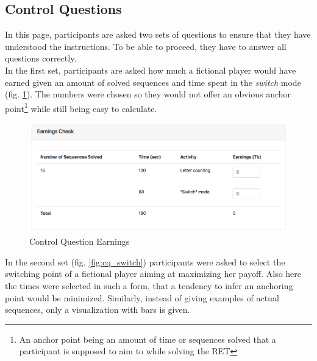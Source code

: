     \subsection{Control Questions}
    
    In this page, participants are asked two sets of questions to ensure that they have understood the instructions. To be able to proceed, they have to answer all questions correctly.\\
    
    In the first set, participants are asked how much a fictional player would have earned given an amount of solved sequences and time spent in the \textit{switch} mode (fig. \ref{fig:cq_earnings}). The numbers were chosen so they would not offer an obvious anchor point\footnote{An anchor point being an amount of time or sequences solved that a participant is supposed to aim to while solving the RET} while still being easy to calculate.\\
    
    \begin{figure}
        \centering
        \includegraphics[width=\textwidth]{graphs/cq_earnings.png}
        \caption{Control Question Earnings}
        \label{fig:cq_earnings}
    \end{figure}
    
    In the second set (fig. \ref{fig:cq_switch}) participants were asked to select the switching point of a fictional player aiming at maximizing her payoff. Also here the times were selected in such a form, that a tendency to infer an anchoring point would be minimized. Similarly, instead of giving examples of actual sequences, only a visualization with bars is given.
    
